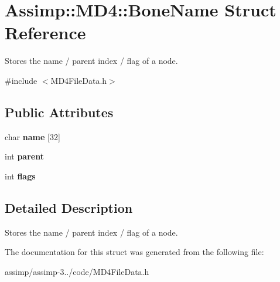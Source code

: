 \hypertarget{struct_assimp_1_1_m_d4_1_1_bone_name}{\section{Assimp\+:\+:M\+D4\+:\+:Bone\+Name Struct Reference}
\label{struct_assimp_1_1_m_d4_1_1_bone_name}
}


Stores the name / parent index / flag of a node.  




{\ttfamily \#include $<$M\+D4\+File\+Data.\+h$>$}

\subsection*{Public Attributes}
\begin{DoxyCompactItemize}
\item 
\hypertarget{struct_assimp_1_1_m_d4_1_1_bone_name_af8743931abb07a7568aa10560d649236}{char {\bfseries name} \mbox{[}32\mbox{]}}\label{struct_assimp_1_1_m_d4_1_1_bone_name_af8743931abb07a7568aa10560d649236}

\item 
\hypertarget{struct_assimp_1_1_m_d4_1_1_bone_name_a906efd10ce30ce2725e7e6918d667013}{int {\bfseries parent}}\label{struct_assimp_1_1_m_d4_1_1_bone_name_a906efd10ce30ce2725e7e6918d667013}

\item 
\hypertarget{struct_assimp_1_1_m_d4_1_1_bone_name_aee046d5215c7b715cc1e245ec0eb7390}{int {\bfseries flags}}\label{struct_assimp_1_1_m_d4_1_1_bone_name_aee046d5215c7b715cc1e245ec0eb7390}

\end{DoxyCompactItemize}


\subsection{Detailed Description}
Stores the name / parent index / flag of a node. 

The documentation for this struct was generated from the following file\+:\begin{DoxyCompactItemize}
\item 
assimp/assimp-\/3../code/M\+D4\+File\+Data.\+h\end{DoxyCompactItemize}
